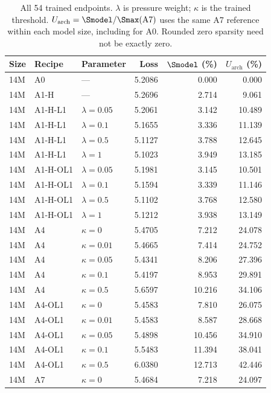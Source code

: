 \begin{table}[p]\centering\small\renewcommand{\arraystretch}{0.95}
\caption{All 54 trained endpoints. $\lambda$ is pressure weight; $\kappa$ is the trained threshold. $U_{\mathrm{arch}}=\Smodel/\Smax(\mathrm{A7})$ uses the same A7 reference within each model size, including for A0. Rounded zero sparsity need not be exactly zero.}\label{tab:trained-endpoints}
\begin{tabular}{@{}lllrrr@{}}
\toprule
Size & Recipe & Parameter & Loss & $\Smodel$ (\%) & $U_{\mathrm{arch}}$ (\%) \\
\midrule
14M & A0 & --- & 5.2086 & 0.000 & 0.000 \\
14M & A1-H & --- & 5.2696 & 2.714 & 9.061 \\
14M & A1-H-L1 & $\lambda=0.05$ & 5.2061 & 3.142 & 10.489 \\
14M & A1-H-L1 & $\lambda=0.1$ & 5.1655 & 3.336 & 11.139 \\
14M & A1-H-L1 & $\lambda=0.5$ & 5.1127 & 3.788 & 12.645 \\
14M & A1-H-L1 & $\lambda=1$ & 5.1023 & 3.949 & 13.185 \\
14M & A1-H-OL1 & $\lambda=0.05$ & 5.1981 & 3.145 & 10.501 \\
14M & A1-H-OL1 & $\lambda=0.1$ & 5.1594 & 3.339 & 11.146 \\
14M & A1-H-OL1 & $\lambda=0.5$ & 5.1102 & 3.768 & 12.580 \\
14M & A1-H-OL1 & $\lambda=1$ & 5.1212 & 3.938 & 13.149 \\
14M & A4 & $\kappa=0$ & 5.4705 & 7.212 & 24.078 \\
14M & A4 & $\kappa=0.01$ & 5.4665 & 7.414 & 24.752 \\
14M & A4 & $\kappa=0.05$ & 5.4341 & 8.206 & 27.396 \\
14M & A4 & $\kappa=0.1$ & 5.4197 & 8.953 & 29.891 \\
14M & A4 & $\kappa=0.5$ & 5.6597 & 10.216 & 34.106 \\
14M & A4-OL1 & $\kappa=0$ & 5.4583 & 7.810 & 26.075 \\
14M & A4-OL1 & $\kappa=0.01$ & 5.4583 & 8.587 & 28.668 \\
14M & A4-OL1 & $\kappa=0.05$ & 5.4898 & 10.456 & 34.910 \\
14M & A4-OL1 & $\kappa=0.1$ & 5.5483 & 11.394 & 38.041 \\
14M & A4-OL1 & $\kappa=0.5$ & 6.0380 & 12.713 & 42.446 \\
14M & A7 & $\kappa=0$ & 5.4684 & 7.218 & 24.097 \\

\end{tabular}
\end{table}
